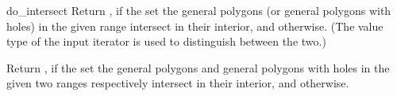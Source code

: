 \begin{ccRefFunction}{do_intersect}
{Return , if the set the general polygons (or general
polygons with holes) in the given range intersect in their interior,
and  otherwise. (The value type of the input iterator is
used to distinguish between the two.)}

{Return , if the set the general polygons and general
polygons with holes in the given two ranges respectively intersect in
their interior, and  otherwise.}

\ccSeeAlso
{}\\
\\
\\

\end{ccRefFunction}

\ccRefPageEnd
